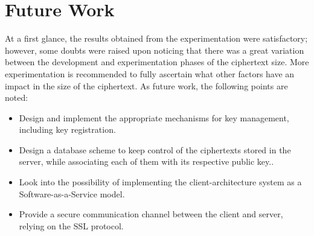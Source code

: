 \section{Future Work}
At a first glance, the results obtained from the experimentation were satisfactory; however, some doubts were raised upon noticing that there was a great variation between the development and experimentation phases of the ciphertext size. More experimentation is recommended to fully ascertain what other factors have an impact in the size of the ciphertext. As future work, the following points are noted:

\begin{itemize}
\item Design and implement the appropriate mechanisms for key management, including key registration.
\item Design a database scheme to keep control of the ciphertexts stored in the server, while associating each of them with its respective public key..
\item Look into the possibility of implementing the client-architecture system as a Software-as-a-Service model.
\item Provide a secure communication channel between the client and server, relying on the SSL protocol.
\end{itemize}

\clearpage
